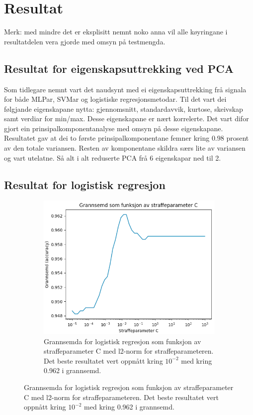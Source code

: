 \documentclass[oneside, nynorsk]{book}
\begin{document}
\chapter{Resultat}        %
Merk: med mindre det er eksplisitt nemnt noko anna vil alle køyringane i resultatdelen vera gjorde med omsyn på testmengda.
\section{Resultat for eigenskapsuttrekking ved PCA}
Som tidlegare nemnt vart det naudsynt med ei eigenskapsuttrekking frå signala for både MLPar, SVMar og logistiske regresjonsmetodar.
Til det vart dei følgjande eigenskapane nytta: gjennomsnitt, standardavvik, kurtose, skeivskap samt verdiar for min/max.
Desse eigenskapane er nært korrelerte. Det vart difor gjort ein prinsipalkomponentanalyse med omsyn på desse eigenskapane.
Resultatet gav at dei to første prinsipalkomponentane femner kring $0.98$ prosent av den totale variansen. Resten av komponentane skildra særs lite av variansen og vart utelatne.
Så alt i alt reduserte PCA frå 6 eigenskapar ned til 2.
\newpage
\section{Resultat for logistisk regresjon}

\begin{figure}[h!]
  \begin{subfigure}{\textwidth}
        \centering
        \centerline{\includegraphics[width=0.7\linewidth]{LR_L2}}
        \caption{Grannsemda for logistisk regresjon som funksjon av straffeparameter C med l2-norm for straffeparameteren. Det beste resultatet vert oppnått kring $10^{-2}$ med kring 0.962 i grannsemd.}
        \label{LRL2}
    \end{subfigure}
\end{figure}
\end{document}
